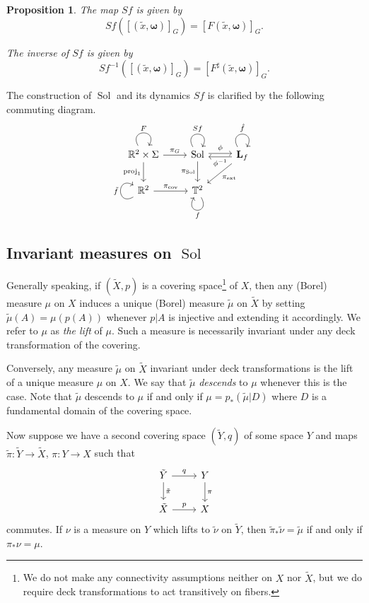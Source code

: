 \documentclass[11pt,letterpaper,reqno]{article}
\newtheorem{proposition}{Proposition}[section]
\newcommand{\TT}{\mathbb{T}^2}
\newcommand{\RR}{\mathbb{R}^2}
\newcommand{\hTTf}[1][f]{\mathbf{L}_{#1}}
\newcommand{\tf}{\tilde{f}}
\newcommand{\tx}{\tilde{x}}
\newcommand{\tmu}{\tilde{\mu}}
\newcommand{\bomega}{\boldsymbol{\omega}}
\newcommand{\hf}{\hat{f}}
\newcommand{\pcov}{\pi_{\mathrm{cov}}}
\newcommand{\pext}{\pi_{\mathrm{ext}}}
\newcommand{\Sol}{\operatorname{Sol}}
\newcommand{\proj}{\operatorname{proj}}
\newcommand{\fsol}{Sf}
\begin{document}
\begin{proposition}\label{expression_of_fsol}
The map $\fsol$ is given by
\[\fsol([(\tx, \bomega)]_G) = [F(\tx, \bomega)]_G.\] 

The inverse of $\fsol$ is given by
\[\fsol^{-1}([(\tx, \bomega)]_G) = [F^\sharp (\tx, \bomega)]_G.\]
\end{proposition}

The construction of $\Sol$ and its dynamics $\fsol$ is clarified by the following commuting diagram. 
\begin{equation}
\begin{tikzcd}
\RR \times \Sigma 
\ar[loop, out=120, in=60, distance=20, "F"]
\ar[r, "\pi_G"] \ar[d, "\proj_1", swap] 
& \Sol  \ar[r, shift left=0.4ex,  "\phi"] \ar[d, "\pi_{\Sol}", swap] \ar[loop, out=120, in=60, distance=20, "\fsol"]
& \hTTf  \ar[l, shift left=0.4ex, "\phi^{-1}"] \ar[ld, "\pext"]  \ar[loop, out=120, in=60, distance=20, "\hf"] \\
\RR \ar[r, "\pcov"] 
\ar[loop, out=210, in=150, distance=20, "\tf"]
& \TT \ar[loop, out=300, in=240, distance=20, "f"]
\end{tikzcd}
\end{equation}


\subsection{Invariant measures on \texorpdfstring{$\Sol$}{Sol}} \label{invariant_on_sol}



Generally speaking, if $(\tilde{X}, p)$ is a covering space\footnote{We do not make any connectivity assumptions neither on $X$ nor $\tilde{X}$, but we do require deck transformations to act transitively on fibers.} of $X$, then any (Borel) measure $\mu$ on $X$ induces a unique (Borel) measure $\tmu$ on $ \tilde{X}$ by setting $\tmu(A) = \mu(p(A))$ whenever $p \vert A$ is injective and extending it accordingly. We refer to $\mu$ as \emph{the lift} of $\mu$. Such a measure is necessarily invariant under any deck transformation of the covering.

Conversely, any measure $\tmu$ on $\tilde{X}$ invariant under deck transformations is the lift of a unique measure $\mu$ on $X$. We say that $\tmu$ \emph{descends} to $\mu$ whenever this is the case. Note that $\tmu$ descends to $\mu$ if and only if $\mu = p_*(\tmu \vert D)$ where $D$ is a fundamental domain of the covering space.

Now suppose we have a second covering space $(\tilde{Y}, q)$ of some space $Y$ and maps $\tilde{\pi}: \tilde{Y} \to \tilde{X}$, $\pi: Y \to X$ such that
\[
\begin{tikzcd}
\tilde{Y} \ar[r, "q"] \ar[d, "\tilde{\pi}"] & Y \ar[d, "\pi"] \\
\tilde{X} \ar[r, "p"] & X
\end{tikzcd}
\]
commutes. If $\nu$ is a measure on $Y$ which lifts to $\tilde{\nu}$ on $\tilde{Y}$, then $\tilde{\pi}_* \tilde{\nu} = \tmu$ if and only if $\pi_*\nu = \mu$. 
\end{document}
